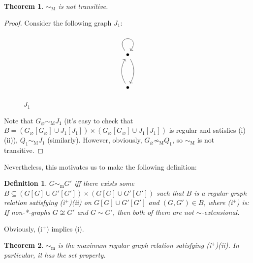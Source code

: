 \documentclass{amsart}
\newtheorem{theorem}{Theorem}
\newtheorem{definition}{Definition}
\begin{document}
\begin{theorem}
    $\sim_\mathrm{M}$ is not transitive.
\end{theorem}

\begin{proof}
    Consider the following graph $J_1$:
    
\begin{figure}[htbp]
\[\begin{tikzcd}
	\bullet \\
	\\
	\bullet
	\arrow[from=1-1, to=1-1, loop, in=55, out=125, distance=10mm]
	\arrow[bend left, from=1-1, to=3-1]
	\arrow[bend left, from=3-1, to=1-1]
\end{tikzcd}\]
\caption{$J_1$}
\end{figure}

    Note that $G_\varnothing\sim_\mathrm{M} J_1$ (it's easy to check that $B=(G_\varnothing[G_\varnothing]\cup J_1[J_1])\times(G_\varnothing[G_\varnothing]\cup J_1[J_1])$ is regular and satisfies (i)(ii)), $Q_1\sim_\mathrm{M} J_1$ (similarly).
    However, obviously, $G_\varnothing\not\sim_\mathrm{M} Q_1$, so $\sim_\mathrm{M}$ is not transitive.
\end{proof}

Nevertheless, this motivates us to make the following definition:

\begin{definition}
    $G\sim_\mathrm{m} G'$ iff there exists some $B\subseteq (G[G]\cup G'[G'])\times(G[G]\cup G'[G'])$ such that $B$ is a regular graph relation satisfying (i$^+$)(ii) on $G[G]\cup G'[G']$ and $(G,G')\in B$, where (i$^+$) is: If non-*-graphs $G\not\cong G'$ and $G\sim G'$, then both of them are not $\sim$-extensional.
\end{definition}

Obviously, (i$^+$) implies (i).

\begin{theorem}
    $\sim_\mathrm{m}$ is the maximum regular graph relation satisfying (i$^+$)(ii). In particular, it has the set property.
\end{theorem}
\end{document}
